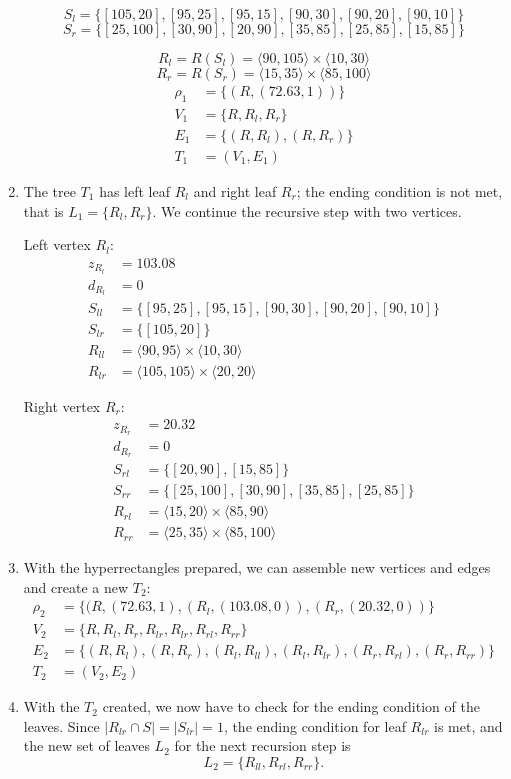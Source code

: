 \begin{example}
\begin{enumerate}
$$S_l = \{[105,20],[95,25],[95,15],[90,30],[90,20],[90,10]\}$$
$$S_r = \{[25,100],[30,90],[20,90],[35,85],[25,85],[15,85]\}$$

$$R_l = R(S_l) = \langle 90, 105 \rangle \times \langle 10, 30 \rangle$$
$$R_r = R(S_r) = \langle 15, 35 \rangle \times \langle 85, 100 \rangle$$
\begin{align*}
\rho_1 &= \{ (R, (72.63, 1))\}\\
V_1 &= \{R, R_l, R_r\}\\
E_1 &= \{(R,R_l), (R,R_r)\}\\
T_1 &= (V_1, E_1)
\end{align*}
\item The tree $T_1$ has left leaf $R_l$ and right leaf $R_r$; the ending condition is not met, that is $L_1 = \{R_l,R_r\}$. We continue the recursive step with two vertices.

Left vertex $R_l$:
\begin{align*}
z_{R_l} &= 103.08\\
d_{R_l} &= 0\\
S_{ll} &= \{[95,25],[95,15],[90,30],[90,20],[90,10]\}\\
S_{lr} &= \{[105,20]\}\\
R_{ll} &= \langle 90, 95 \rangle \times \langle 10, 30\rangle\\
R_{lr} &= \langle 105, 105 \rangle \times \langle 20, 20\rangle
\end{align*}

Right vertex $R_r$:
\begin{align*}
z_{R_r}&= 20.32\\
d_{R_r}&= 0\\
S_{rl}&= \{[20,90],[15,85]\}\\
S_{rr}&= \{[25,100],[30,90],[35,85],[25,85]\}\\
R_{rl}&= \langle 15, 20 \rangle \times \langle 85, 90 \rangle\\
R_{rr}&= \langle 25, 35 \rangle \times \langle 85, 100 \rangle
\end{align*}
\item With the hyperrectangles prepared, we can assemble new vertices and edges and create a new $T_2$:
\begin{align*}
\rho_2 &= \{(R,(72.63,1), (R_l, (103.08, 0)), (R_r, (20.32, 0)) \}\\
V_2 &= \{ R, R_l, R_r, R_{lr}, R_{lr}, R_{rl}, R_{rr} \}\\
E_2 &= \{ (R,R_l),(R,R_r), (R_l,R_{ll}), (R_l,R_{lr}), (R_r,R_{rl}), (R_r,R_{rr}) \}\\
T_2 &= (V_2, E_2)
\end{align*}
\item With the $T_2$ created, we now have to check for the ending condition of the leaves. Since $|R_{lr}\cap S|=|S_{lr}| = 1$, the ending condition for leaf $R_{lr}$ is met, and the new set of leaves $L_2$ for the next recursion step is
$$L_2 = \{R_{ll},R_{rl},R_{rr}\}.$$


\end{enumerate}
\end{example}

